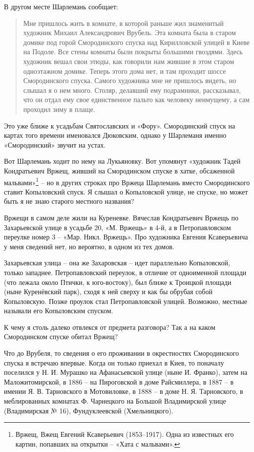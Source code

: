 В другом месте Шарлемань сообщает\cite{sharl01}:

\begin{quotation}
Мне пришлось жить в комнате, в которой раньше жил знаменитый художник Михаил Александрович Врубель. Эта комната была в старом домике под горой Смородинского спуска над Кирилловской улицей в Киеве на Подоле. Все стены комнаты были покрыты большими гвоздями. Здесь художник вешал свои этюды, как говорили нам жившие в этом старом одноэтажном домике. Теперь этого дома нет, и там проходит шоссе Смородинского спуска. Самого художника мне не пришлось видеть, но слышал я о нем много. Столяр, делавший ему подрамники, рассказывал, что он отдал ему свое единственное пальто как человеку неимущему, а сам проходил зиму в плаще.
\end{quotation}

Это уже ближе к усадьбам Святославских и «Фору». Смородинский спуск на картах того времени именовался Дюковским, однако у Шарлеманя именно «Смородинский» звучит на устах.

Вот Шарлемань ходит по нему на Лукьяновку. Вот упомянут «художник Тадей Кондратьевич Вржещ, живший на Смородинском спуске в хатке, обсаженной мальвами»\footnote{Вржещ, Вжещ Евгений Ксаверьевич (1853–1917). Одна из известных его картин, попавших на открытки – «Хата с мальвами».} – но в других строках про Вржеца Шарлемань вместо Смородинского ставит Копыловский спуск. Я слышал о Копыловской улице, не спуске, но может быть я не знаю старого местного названия?

Вржещи в самом деле жили на Куреневке. Вячеслав Кондратьевич Вржещь по Захарьевской улице в усадьбе 20, «М. Вржещь» в 4-й, а в Петропавловском переулке номер 3 – «Мар. Никл. Вржещь». Про художника Евгения Ксаверьевича у меня сведений нет, но вероятно, в одном из тех домов.

Захарьевская улица – она же Захаровская – идет параллельно Копыловской, только западнее. Петропавловский переулок, в отличие от одноименной площади (что лежала около Птички, к юго-востоку), был ближе к Троицкой площади (ныне Куренёвский парк), сходя к ней сверху и как бы обрубая собой Копыловскую. Позже проулок стал Петропавловской улицей. Возможно, местные называли его Копыловским спуском.

К чему я столь далеко отвлекся от предмета разговора? Так а на каком Смородинском спуске обитал Вржещ?

Что до Врубеля, то сведения о его проживании в окрестностях Смородинского спуска я встречаю впервые. Когда он только приехал в Киев, то поначалу поселился у Н. И. Мурашко на Афанасьевской улице (ныне И. Франко), затем на Маложитомирской, в 1886 – на Пироговской в доме Райсмиллера, в 1887 – в имении Я. В. Тарновского в Мотовиловке, в 1888 – в доме Н. Я. Тарновского, в меблированных комнатах Ф. Чарнецкого на Большой Владимирской улице (Владимирская № 16), Фундуклеевской (Хмельницкого). 

